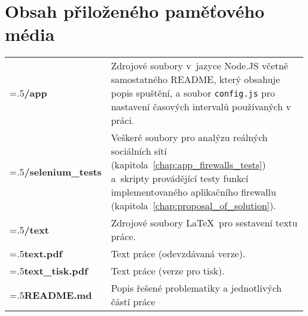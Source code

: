 \chapter{Obsah přiloženého paměťového média}

\setlength{\extrarowheight}{15pt}

\begin{table}[H]
\begin{tabularx}{\linewidth}{
  >{\raggedright\arraybackslash\hsize=.5\hsize}X >{\hsize=1.5\hsize}X
  }

\textbf{/app} & Zdrojové soubory v~jazyce Node.JS včetně samostatného README, který obsahuje popis spuštění, a soubor \texttt{config.js} pro nastavení časových intervalů používaných v práci.\\

\textbf{/selenium\_tests} & Veškeré soubory pro analýzu reálných sociálních sítí (kapitola~\ref{chap:app_firewalls_tests}) a~skripty provádějící testy funkcí implementovaného aplikačního firewallu (kapitola~\ref{chap:proposal_of_solution}). \\

\textbf{/text} & Zdrojové soubory \LaTeX~pro sestavení textu práce. \\

\textbf{text.pdf} & Text práce (odevzdávaná verze). \\

\textbf{text\_tisk.pdf} & Text práce (verze pro tisk). \\
\textbf{README.md} & Popis řešené problematiky a jednotlivých částí práce \\

\end{tabularx}
\end{table}